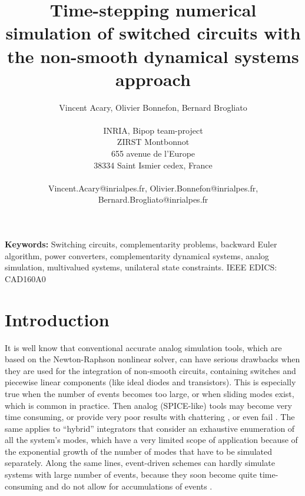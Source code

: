 \documentclass{article}
\begin{document}
\pagestyle{fancy}

\title{Time-stepping numerical simulation of switched circuits with the non-smooth dynamical systems approach} 

\author{Vincent Acary, Olivier Bonnefon, Bernard Brogliato \\ \\ INRIA, Bipop team-project \\ ZIRST Montbonnot \\ 655 avenue de l'Europe
\\ 38334 Saint Ismier cedex, France \\ \\  Vincent.Acary@inrialpes.fr, Olivier.Bonnefon@inrialpes.fr, Bernard.Brogliato@inrialpes.fr}




\maketitle 

\thispagestyle{fancy}


{\bf Keywords:} Switching circuits, complementarity problems, backward Euler algorithm, power converters, complementarity dynamical systems, analog simulation, multivalued systems, unilateral state constraints. IEEE EDICS: CAD160A0


\begin{abstract}

\end{abstract}



\section{Introduction}



It is well know that conventional accurate analog simulation tools, which are based on the Newton-Raphson nonlinear solver, can have serious drawbacks when they are used for the integration of non-smooth circuits, containing switches and piecewise linear components (like ideal diodes and transistors). This is especially true when the number of events becomes too large, or when sliding modes exist, which is common in practice. Then analog (SPICE-like) tools  may become very time consuming, or provide very poor results with chattering \cite{galias2006}, or even fail \cite{maffezzoni2006,yuan2003,mayaram2000,chung1994,biolek2007}. The same applies to ``hybrid'' integrators that consider an exhaustive enumeration of all the system's modes, which have a very limited scope of application because of the exponential growth of the number of modes that have to be simulated separately. Along the same lines, event-driven schemes can hardly simulate systems with large number of events, because they soon become quite time-consuming and do not allow for accumulations of events \cite{acary-brogliato2008}. 
\end{document}
